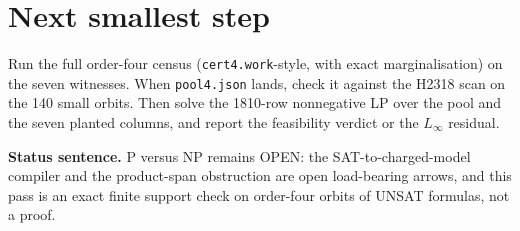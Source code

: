 \documentclass[11pt]{article}
\begin{document}
\section*{Next smallest step}
Run the full order-four census (\texttt{cert4.work}-style, with exact marginalisation) on the seven witnesses. When \texttt{pool4.json} lands, check it against the H2318 scan on the 140 small orbits. Then solve the 1810-row nonnegative LP over the pool and the seven planted columns, and report the feasibility verdict or the $L_\infty$ residual.

\bigskip
\noindent\textbf{Status sentence.} P versus NP remains OPEN: the SAT-to-charged-model compiler and the product-span obstruction are open load-bearing arrows, and this pass is an exact finite support check on order-four orbits of UNSAT formulas, not a proof.
\end{document}
